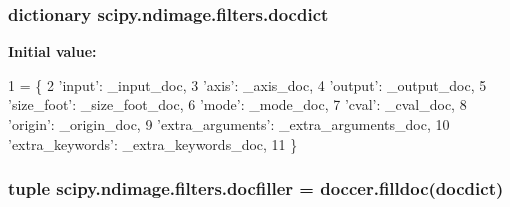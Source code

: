 \subsubsection[{docdict}]{\setlength{\rightskip}{0pt plus 5cm}dictionary scipy.\+ndimage.\+filters.\+docdict}\label{namespacescipy_1_1ndimage_1_1filters_a3ef4ac5181e80a02cfaad0bb6e786db3}
{\bfseries Initial value\+:}
\begin{DoxyCode}
1 = \{
2     \textcolor{stringliteral}{'input'}: \_input\_doc,
3     \textcolor{stringliteral}{'axis'}: \_axis\_doc,
4     \textcolor{stringliteral}{'output'}: \_output\_doc,
5     \textcolor{stringliteral}{'size\_foot'}: \_size\_foot\_doc,
6     \textcolor{stringliteral}{'mode'}: \_mode\_doc,
7     \textcolor{stringliteral}{'cval'}: \_cval\_doc,
8     \textcolor{stringliteral}{'origin'}: \_origin\_doc,
9     \textcolor{stringliteral}{'extra\_arguments'}: \_extra\_arguments\_doc,
10     \textcolor{stringliteral}{'extra\_keywords'}: \_extra\_keywords\_doc,
11     \}
\end{DoxyCode}
\hypertarget{namespacescipy_1_1ndimage_1_1filters_a5d480e01864ddd5886da30ab77494d2a}{}
\subsubsection[{docfiller}]{\setlength{\rightskip}{0pt plus 5cm}tuple scipy.\+ndimage.\+filters.\+docfiller = doccer.\+filldoc({\bf docdict})}\label{namespacescipy_1_1ndimage_1_1filters_a5d480e01864ddd5886da30ab77494d2a}
